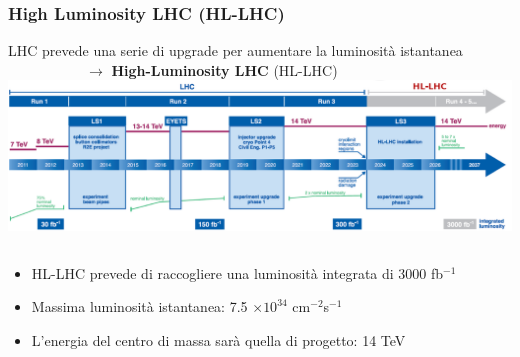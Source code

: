 \documentclass{beamer}
\begin{document}
\begin{frame}[t]
\frametitle{High Luminosity LHC (HL-LHC)}

LHC prevede una serie di upgrade per aumentare la luminosit\`a istantanea \\
\ \ \ \ \ \ \ \ \ \ \  $\rightarrow$ \textbf{High-Luminosity LHC} (HL-LHC)
\vskip0.2cm
\includegraphics[width=\textwidth]{HLLHC_Plan}

\begin{columns}
\begin{column}{0.7\textwidth}
\end{column}
\begin{column}{0.3\textwidth}
\end{column}
\end{columns}
\medskip
\begin{itemize}
\item HL-LHC prevede di raccogliere una luminosit\`a integrata di 3000 fb$^{-1}$
\item Massima luminosit\`a istantanea: 7.5 $\times 10^{34}$ cm$^{-2}$s$^{-1}$
\item L'energia del centro di massa sar\`a quella di progetto: 14 TeV
\end{itemize}

\end{frame}

\end{document}
